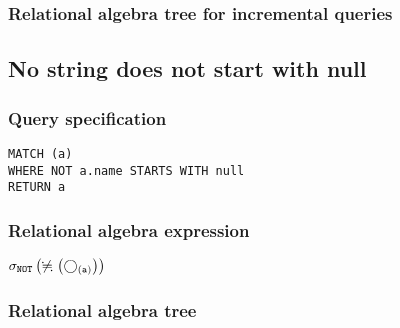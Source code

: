 \subsubsection*{Relational algebra tree for incremental queries}


\subsection{No string does not start with null}

\subsubsection*{Query specification}

\begin{lstlisting}
MATCH (a)
WHERE NOT a.name STARTS WITH null
RETURN a
\end{lstlisting}

\subsubsection*{Relational algebra expression}

$\selection{\mathtt{NOT}} \left(\alldifferent{} \left(\getvertices{a}{}\right)\right)$

\subsubsection*{Relational algebra tree}


